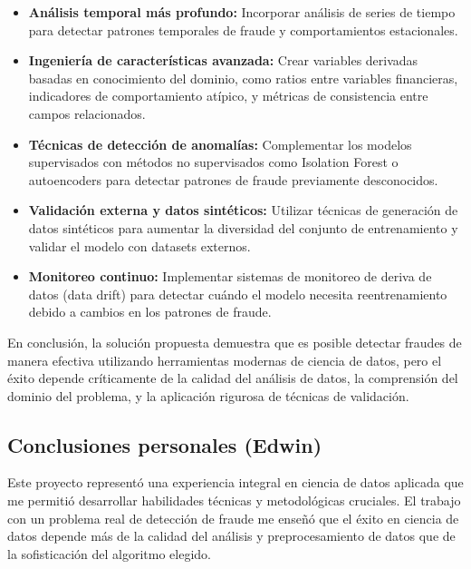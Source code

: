 \documentclass{llncs}
\begin{document}
\begin{itemize}
    \item \textbf{Análisis temporal más profundo:} Incorporar análisis de series de tiempo para detectar patrones temporales de fraude y comportamientos estacionales.
    
    \item \textbf{Ingeniería de características avanzada:} Crear variables derivadas basadas en conocimiento del dominio, como ratios entre variables financieras, indicadores de comportamiento atípico, y métricas de consistencia entre campos relacionados.
    
    \item \textbf{Técnicas de detección de anomalías:} Complementar los modelos supervisados con métodos no supervisados como Isolation Forest o autoencoders para detectar patrones de fraude previamente desconocidos.
    
    \item \textbf{Validación externa y datos sintéticos:} Utilizar técnicas de generación de datos sintéticos para aumentar la diversidad del conjunto de entrenamiento y validar el modelo con datasets externos.
    
    \item \textbf{Monitoreo continuo:} Implementar sistemas de monitoreo de deriva de datos (data drift) para detectar cuándo el modelo necesita reentrenamiento debido a cambios en los patrones de fraude.
\end{itemize}

En conclusión, la solución propuesta demuestra que es posible detectar fraudes de manera efectiva utilizando herramientas modernas de ciencia de datos, pero el éxito depende críticamente de la calidad del análisis de datos, la comprensión del dominio del problema, y la aplicación rigurosa de técnicas de validación.

\subsection*{Conclusiones personales (Edwin)}

Este proyecto representó una experiencia integral en ciencia de datos aplicada que me permitió desarrollar habilidades técnicas y metodológicas cruciales. El trabajo con un problema real de detección de fraude me enseñó que el éxito en ciencia de datos depende más de la calidad del análisis y preprocesamiento de datos que de la sofisticación del algoritmo elegido. 
\end{document}
